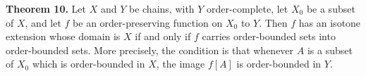 \textbf{Theorem 10.} Let $X$ and $Y$ be chains, with $Y$ order-complete, let $X_0$ be a subset of $X$, and let $f$ be an order-preserving function on $X_0$ to $Y$. Then $f$ has an isotone extension whose domain is $X$ if and only if $f$ carries order-bounded sets into order-bounded sets. More precisely, the condition is that whenever $A$ is a subset of $X_0$ which is order-bounded in $X$, the image $f[A]$ is order-bounded in $Y$.
